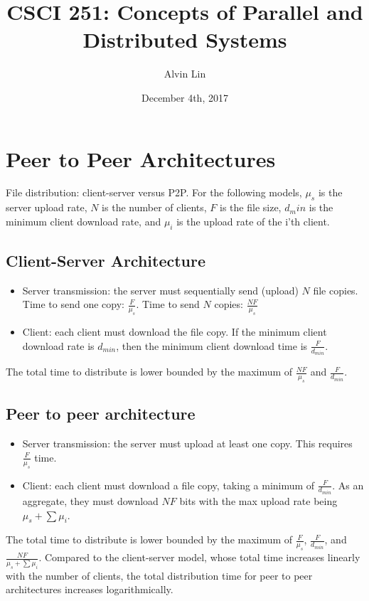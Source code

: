 \documentclass{math}
\title{CSCI 251: Concepts of Parallel and Distributed Systems}
\author{Alvin Lin}
\date{December 4th, 2017}
\begin{document}
\maketitle

\section*{Peer to Peer Architectures}
File distribution: client-server versus P2P. For the following models,
\( \mu_s \) is the server upload rate, \( N \) is the number of clients, \( F \)
is the file size, \( d_min \) is the minimum client download rate, and
\( \mu_i \) is the upload rate of the i'th client.

\subsection*{Client-Server Architecture}
\begin{itemize}
  \item Server transmission: the server must sequentially send (upload) \( N \)
  file copies. Time to send one copy: \( \frac{F}{\mu_s} \). Time to send
  \( N \) copies: \( \frac{NF}{\mu_s} \)
  \item Client: each client must download the file copy. If the minimum client
  download rate is \( d_{min} \), then the minimum client download time is
  \( \frac{F}{d_{min}} \).
\end{itemize}
The total time to distribute is lower bounded by the maximum of
\( \frac{NF}{\mu_s} \) and \( \frac{F}{d_{min}} \).

\subsection*{Peer to peer architecture}
\begin{itemize}
  \item Server transmission: the server must upload at least one copy. This
  requires \( \frac{F}{\mu_s} \) time.
  \item Client: each client must download a file copy, taking a minimum of
  \( \frac{F}{d_{min}} \). As an aggregate, they must download \( NF \) bits
  with the max upload rate being \( \mu_s+\sum\mu_i \).
\end{itemize}
The total time to distribute is lower bounded by the maximum of
\( \frac{F}{\mu_s} \), \( \frac{F}{d_{min}} \), and
\( \frac{NF}{\mu_s+\sum\mu_i} \). Compared to the client-server model, whose
total time increases linearly with the number of clients, the total
distribution time for peer to peer architectures increases logarithmically.
\end{document}
